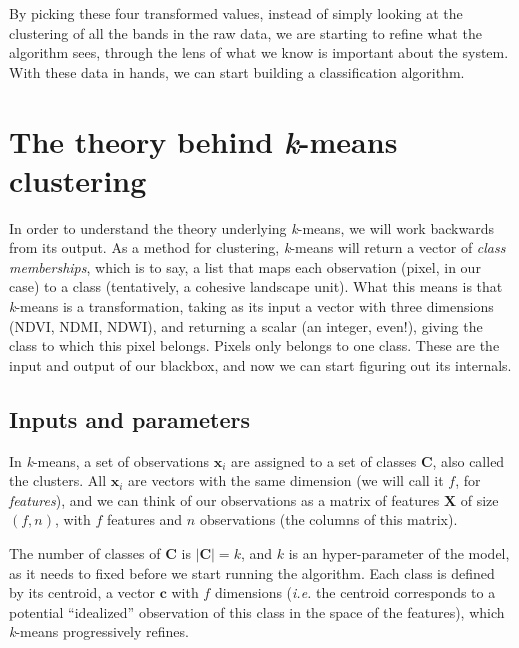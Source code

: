 \documentclass[
  letterpaper,
]{scrbook}
\begin{document}
By picking these four transformed values, instead of simply looking at
the clustering of all the bands in the raw data, we are starting to
refine what the algorithm sees, through the lens of what we know is
important about the system. With these data in hands, we can start
building a classification algorithm.

\section{\texorpdfstring{The theory behind \emph{k}-means
clustering}{The theory behind k-means clustering}}\label{the-theory-behind-k-means-clustering}

In order to understand the theory underlying \emph{k}-means, we will
work backwards from its output. As a method for clustering,
\emph{k}-means will return a vector of \emph{class memberships}, which
is to say, a list that maps each observation (pixel, in our case) to a
class (tentatively, a cohesive landscape unit). What this means is that
\emph{k}-means is a transformation, taking as its input a vector with
three dimensions (NDVI, NDMI, NDWI), and returning a scalar (an integer,
even!), giving the class to which this pixel belongs. Pixels only
belongs to one class. These are the input and output of our blackbox,
and now we can start figuring out its internals.

\subsection{Inputs and parameters}\label{inputs-and-parameters}


In \emph{k}-means, a set of observations \(\mathbf{x}_i\) are assigned
to a set of classes \(\mathbf{C}\), also called the clusters. All
\(\mathbf{x}_i\) are vectors with the same dimension (we will call it
\(f\), for \emph{features}), and we can think of our observations as a
matrix of features \(\mathbf{X}\) of size \((f, n)\), with \(f\)
features and \(n\) observations (the columns of this matrix).

The number of classes of \(\mathbf{C}\) is \(|\mathbf{C}| = k\), and
\(k\) is an hyper-parameter of the model, as it needs to fixed before we
start running the algorithm. Each class is defined by its centroid, a
vector \(\mathbf{c}\) with \(f\) dimensions (\emph{i.e.} the centroid
corresponds to a potential ``idealized'' observation of this class in
the space of the features), which \emph{k}-means progressively refines.
\end{document}
